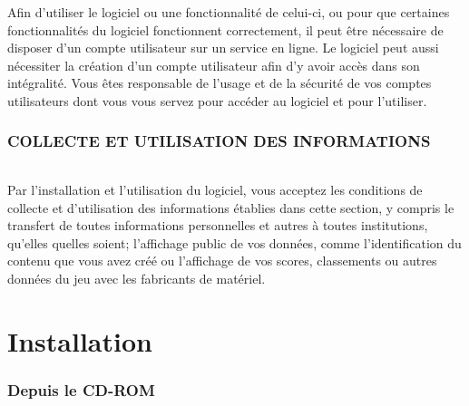 \documentclass[titlepage, 13px, a4paper]{report}
\begin{document}
Afin d'utiliser le logiciel ou une fonctionnalité de celui-ci, ou pour que
certaines fonctionnalités du logiciel fonctionnent correctement, il peut être
nécessaire de disposer d'un compte utilisateur sur un service en ligne.
Le logiciel peut aussi nécessiter la création d'un compte utilisateur
afin d'y avoir accès dans son intégralité. Vous êtes responsable de
l'usage et de la sécurité de vos comptes utilisateurs dont vous vous servez
pour accéder au logiciel et pour l'utiliser. \\


\section*{COLLECTE ET UTILISATION DES INFORMATIONS}
\paragraph*{} \hspace{0pt}
Par l'installation et l'utilisation du logiciel, vous acceptez les conditions
de collecte et d'utilisation des informations établies dans cette section, y
compris le transfert de toutes informations personnelles et autres à toutes
institutions, qu'elles quelles soient; l'affichage public de vos données, comme
l'identification du contenu que vous avez créé ou l'affichage de vos scores,
classements ou autres données du jeu avec les fabricants de matériel. \\


\newpage


\part{Installation} 

\section{Depuis le CD-ROM}
\end{document}
